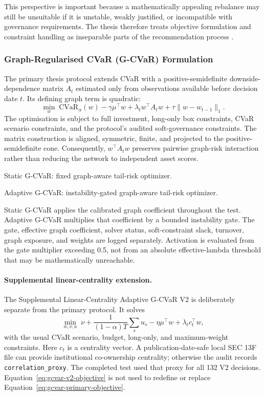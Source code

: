 \documentclass[11pt]{article}
\begin{document}
This perspective is important because a mathematically appealing rebalance may still be unsuitable if it is unstable, weakly justified, or incompatible with governance requirements. The thesis therefore treats objective formulation and constraint handling as inseparable parts of the recommendation process \cite{mifid2014,aiact2024}.

\subsubsection{Graph-Regularised CVaR (G-CVaR) Formulation}
The primary thesis protocol extends CVaR with a positive-semidefinite downside-dependence matrix $A_t$ estimated only from observations available before decision date $t$. Its defining graph term is quadratic:
\begin{equation}
\label{eq:gcvar-primary-objective}
\min_w\; \mathrm{CVaR}_{\alpha}(w)-\gamma\mu^{\top}w
       +\lambda_t w^{\top} A_t w
       +\tau\lVert w-w_{t-1}\rVert_1.
\end{equation}
The optimisation is subject to full investment, long-only box constraints, CVaR scenario constraints, and the protocol's audited soft-governance constraints. The matrix construction is aligned, symmetric, finite, and projected to the positive-semidefinite cone. Consequently, $w^{\top} A_t w$ preserves pairwise graph-risk interaction rather than reducing the network to independent asset scores.

\noindent Static G-CVaR: fixed graph-aware tail-risk optimizer.

\noindent Adaptive G-CVaR: instability-gated graph-aware tail-risk optimizer.

Static G-CVaR applies the calibrated graph coefficient throughout the test. Adaptive G-CVaR multiplies that coefficient by a bounded instability gate. The gate, effective graph coefficient, solver status, soft-constraint slack, turnover, graph exposure, and weights are logged separately. Activation is evaluated from the gate multiplier exceeding 0.5, not from an absolute effective-lambda threshold that may be mathematically unreachable.

\paragraph{Supplemental linear-centrality extension.}
The Supplemental Linear-Centrality Adaptive G-CVaR V2 is deliberately separate from the primary protocol. It solves
\begin{equation}
\label{eq:gcvar-v2-objective}
\min_{w,\nu,u}\; \nu+\frac{1}{(1-\alpha)T}\sum_s u_s
      -\eta\mu^{\top}w+\lambda_t c_t^{\top}w,
\end{equation}
with the usual CVaR scenario, budget, long-only, and maximum-weight constraints. Here $c_t$ is a centrality vector. A publication-date-safe local SEC 13F file can provide institutional co-ownership centrality; otherwise the audit records \texttt{correlation\_proxy}. The completed test used that proxy for all 132 V2 decisions. Equation~\eqref{eq:gcvar-v2-objective} is not used to redefine or replace Equation~\eqref{eq:gcvar-primary-objective}.
\end{document}
